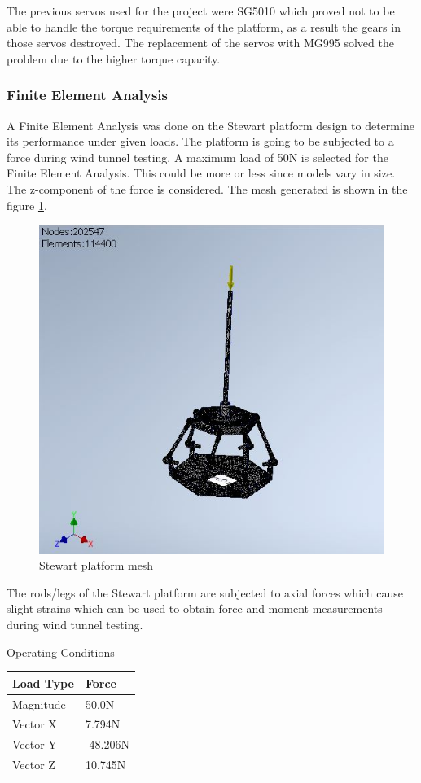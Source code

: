 The previous servos used for the project were SG5010 which proved not to be able to handle the torque requirements of the platform,
as a result the gears in those servos destroyed. The replacement of the servos with MG995 solved the problem due to the higher torque capacity.

\subsubsection{Finite Element Analysis}
A Finite Element Analysis was done on the Stewart platform design to determine its performance under given loads. The platform is going to be subjected to a force during wind tunnel testing. A maximum load of 50N is selected for the Finite Element Analysis. This could be more or less since models vary in size. The z-component of the force is considered.
The mesh generated is shown in the figure \ref{fig:feamesh}.
\begin{center}
	\begin{figure}[H]
		\centering
		\includegraphics[width=0.75\linewidth]{Figures/FEA}
		\caption[Stewart platform mesh]{Stewart platform mesh}
		\label{fig:feamesh}
	\end{figure}
\end{center}
The rods/legs of the Stewart platform are subjected to axial forces which cause slight strains which can be used to obtain force and moment measurements during wind tunnel testing.
\clearpage
\begin{center}
	\begin{table}[H]
		\caption{Operating Conditions}
		\centering
	\end{table}
	\begin{tabular}{|l|l|}
		\hline
		\textbf{Load Type} & \textbf{Force} \\
		\hline
		Magnitude          & 50.0N          \\
		\hline
		Vector X           & 7.794N         \\
		\hline
		Vector Y           & -48.206N       \\
		\hline
		Vector Z           & 10.745N        \\
		\hline
	\end{tabular}
\end{center}

